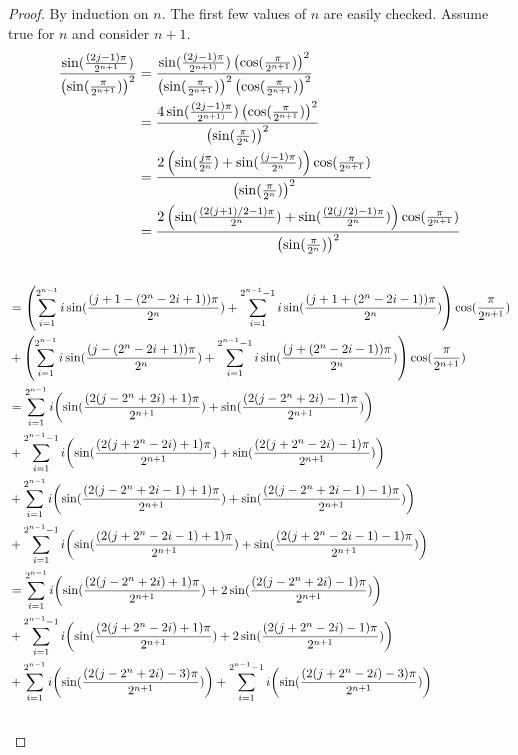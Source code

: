 \documentclass[fleqn,a4paper,9pt]{article}
\begin{document}
\begin{flushleft}
\begin{proof}
By induction on $n$. The first few values of $n$ are easily checked. Assume true for $n$ and consider $n+1$.
\begin{align}
\frac{\sin(\frac{(2j-1)\pi}{2^{n+1}})}{\left(\sin(\frac{\pi}{2^{n+1}})\right)^2}&=\frac{\sin(\frac{(2j-1)\pi}{2^{n+1)}})\left(\cos(\frac{\pi}{2^{n+1}})\right)^2 }{ \left(\sin(\frac{\pi}{2^{n+1}})\right)^2\left(\cos(\frac{\pi}{2^{n+1}})\right)^2  }\\\notag
&=\frac{4\sin(\frac{(2j-1)\pi}{2^{n+1)}})\left(\cos(\frac{\pi}{2^{n+1}})\right)^2 }{ \left(\sin(\frac{\pi}{2^{n}})\right)^2  }\\\notag
&=\frac{2\left(\sin(\frac{j\pi}{2^{n}})+\sin(\frac{(j-1)\pi}{2^{n}})\right)\cos(\frac{\pi}{2^{n+1}}) }{ \left(\sin(\frac{\pi}{2^{n}})\right)^2  }\\\notag
&=\frac{2\left(\sin(\frac{(2(j+1)/2-1)\pi}{2^{n}})+\sin(\frac{(2(j/2)-1)\pi}{2^{n}})\right)\cos(\frac{\pi}{2^{n+1}}) }{ \left(\sin(\frac{\pi}{2^{n}})\right)^2  }\\\notag
\end{align}
\begin{align}
&=\left(\sum_{i=1}^{2^{n-1}}i\sin(\frac{(j+1-(2^n-2i+1))\pi}{2^n})+\sum_{i=1}^{2^{n-1}-1}i\sin(\frac{(j+1+(2^n-2i-1))\pi}{2^n})\right)\cos(\frac{\pi}{2^{n+1}})\\\notag
&+\left(\sum_{i=1}^{2^{n-1}}i\sin(\frac{(j-(2^n-2i+1))\pi}{2^n})+\sum_{i=1}^{2^{n-1}-1}i\sin(\frac{(j+(2^n-2i-1))\pi}{2^n})\right)\cos(\frac{\pi}{2^{n+1}})\\\notag
&=\sum_{i=1}^{2^{n-1}}i\biggl(\sin(\frac{(2(j-2^n+2i)+1)\pi}{2^{n+1}})+\sin(\frac{(2(j-2^n+2i)-1)\pi}{2^{n+1}})\biggr)\\\notag
&+\sum_{i=1}^{2^{n-1}-1}i\biggl(\sin(\frac{(2(j+2^n-2i)+1)\pi}{2^{n+1}})+\sin(\frac{(2(j+2^n-2i)-1)\pi}{2^{n+1}})\biggr)\\\notag
&+\sum_{i=1}^{2^{n-1}}i\biggl(\sin(\frac{(2(j-2^n+2i-1)+1)\pi}{2^{n+1}})+\sin(\frac{(2(j-2^n+2i-1)-1)\pi}{2^{n+1}})\biggr)\\\notag
&+\sum_{i=1}^{2^{n-1}-1}i\biggl(\sin(\frac{(2(j+2^n-2i-1)+1)\pi}{2^{n+1}})+\sin(\frac{(2(j+2^n-2i-1)-1)\pi}{2^{n+1}})\biggr)\\\notag
&=\sum_{i=1}^{2^{n-1}}i\biggl(\sin(\frac{(2(j-2^n+2i)+1)\pi}{2^{n+1}})+2\sin(\frac{(2(j-2^n+2i)-1)\pi}{2^{n+1}})\biggr)\\\notag
&+\sum_{i=1}^{2^{n-1}-1}i\biggl(\sin(\frac{(2(j+2^n-2i)+1)\pi}{2^{n+1}})+2\sin(\frac{(2(j+2^n-2i)-1)\pi}{2^{n+1}})\biggr)\\\notag
&+\sum_{i=1}^{2^{n-1}}i\biggl(\sin(\frac{(2(j-2^n+2i)-3)\pi}{2^{n+1}})\biggr)+\sum_{i=1}^{2^{n-1}-1}i\biggl(\sin(\frac{(2(j+2^n-2i)-3)\pi}{2^{n+1}})\biggr)\\\notag

\end{align}
\end{proof}
\end{flushleft}
\end{document}
